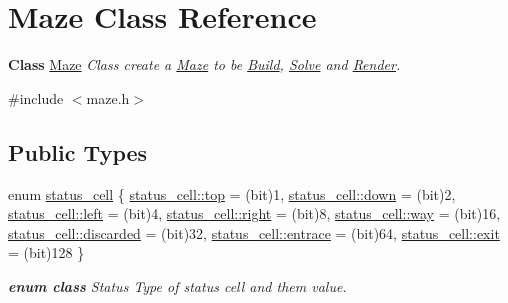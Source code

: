 \hypertarget{classMaze}{}\section{Maze Class Reference}
\label{classMaze}


{\bfseries Class} \hyperlink{classMaze}{Maze} {\itshape Class create a \hyperlink{classMaze}{Maze} to be \hyperlink{classBuild}{Build}, \hyperlink{classSolve}{Solve} and \hyperlink{classRender}{Render}.}  




{\ttfamily \#include $<$maze.\+h$>$}

\subsection*{Public Types}
\begin{DoxyCompactItemize}
\item 
enum \hyperlink{classMaze_a07167e321eac2b67100fb82ecb98f1d1}{status\+\_\+cell} \{ \newline
\hyperlink{classMaze_a07167e321eac2b67100fb82ecb98f1d1ab28354b543375bfa94dabaeda722927f}{status\+\_\+cell\+::top} = (bit)1, 
\hyperlink{classMaze_a07167e321eac2b67100fb82ecb98f1d1a74e8333ad11685ff3bdae589c8f6e34d}{status\+\_\+cell\+::down} = (bit)2, 
\hyperlink{classMaze_a07167e321eac2b67100fb82ecb98f1d1a811882fecd5c7618d7099ebbd39ea254}{status\+\_\+cell\+::left} = (bit)4, 
\hyperlink{classMaze_a07167e321eac2b67100fb82ecb98f1d1a7c4f29407893c334a6cb7a87bf045c0d}{status\+\_\+cell\+::right} = (bit)8, 
\newline
\hyperlink{classMaze_a07167e321eac2b67100fb82ecb98f1d1ac83b72dd001482ce10f0b106c7a0ed0e}{status\+\_\+cell\+::way} = (bit)16, 
\hyperlink{classMaze_a07167e321eac2b67100fb82ecb98f1d1a94708897ec9db8647dfe695714c98e46}{status\+\_\+cell\+::discarded} = (bit)32, 
\hyperlink{classMaze_a07167e321eac2b67100fb82ecb98f1d1a31f57c97180bdc320a97370c71cf524a}{status\+\_\+cell\+::entrace} = (bit)64, 
\hyperlink{classMaze_a07167e321eac2b67100fb82ecb98f1d1af24f62eeb789199b9b2e467df3b1876b}{status\+\_\+cell\+::exit} = (bit)128
 \}\begin{DoxyCompactList}\small\item\em {\bfseries  enum class} Status {\itshape  Type of status cell and them value.} \end{DoxyCompactList}
\end{DoxyCompactItemize}
